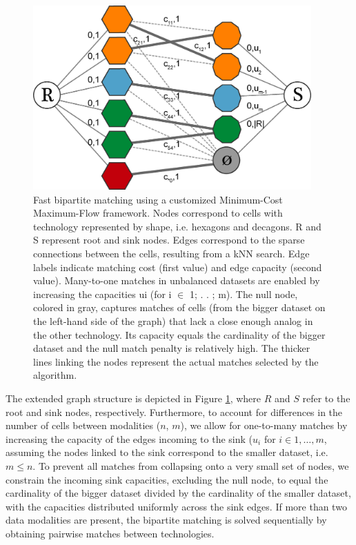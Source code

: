 \begin{figure}
  \begin{center}
    \includegraphics[width=0.95\textwidth]{figures/integration/null-cell.png}
  \end{center}
  \caption{Fast bipartite matching using a customized Minimum-Cost Maximum-Flow framework. Nodes correspond to cells with technology represented by shape, i.e. hexagons and decagons. R and S represent root and sink nodes. Edges correspond to the sparse connections between the cells, resulting from a kNN search. Edge labels indicate matching cost (first value) and edge capacity (second value). Many-to-one matches in unbalanced datasets are enabled by increasing the capacities ui (for i $\in$ 1;  . . ; m). The null node, colored in gray, captures matches of cells (from the bigger dataset on the left-hand side of the graph) that lack a close enough analog in the other technology. Its capacity equals the cardinality of the bigger dataset and the null match penalty is relatively high. The thicker lines linking the nodes represent the actual matches selected by the algorithm.}
  \label{fig:null-cell}
\end{figure}

The extended graph structure is depicted in Figure \ref{fig:null-cell}, where $R$ and $S$ refer to the root and sink nodes, respectively.
Furthermore, to account for differences in the number of cells between modalities ($n$, $m$), we allow for one-to-many matches by increasing the capacity of the edges incoming to the sink ($u_i$ for $i \in {1, \ldots, m}$, assuming the nodes linked to the sink correspond to the smaller dataset, i.e. $m \leq n$.
To prevent all matches from collapsing onto a very small set of nodes, we constrain the incoming sink capacities, excluding the null node, to equal the cardinality of the bigger dataset divided by the cardinality of the smaller dataset, with the capacities distributed uniformly across the sink edges.
If more than two data modalities are present, the bipartite matching is solved sequentially by obtaining pairwise matches between technologies.
